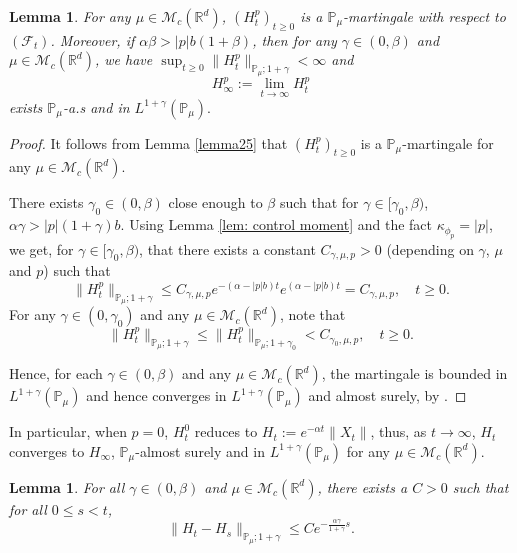 \documentclass[12pt,a4paper]{amsart}
\theoremstyle{plain}
\newtheorem{lem}[thm]{Lemma}
\theoremstyle{definition}
\numberwithin{equation}{section}
\begin{document}
\begin{lem}\label{lemma26}
    For any $\mu\in \mathcal M_c(\mathbb R^d)$, $(H^p_t)_{t\geq 0}$ is a $\mathbb P_\mu$-martingale with respect to $(\mathscr F_t)$.
    Moreover, if $\alpha\beta>|p|b(1+\beta)$, then for any $\gamma\in (0, \beta)$ and $\mu \in \mathcal M_c(\mathbb R^d)$, we have $\sup_{t\geq 0}\|H_t^p\|_{\mathbb P_\mu;1+\gamma}< \infty$ and
\[
    H_{\infty}^p
    :=\lim_{t\rightarrow \infty}H_t^p
\]
exists $\mathbb{P}_{\mu}$-a.s and in $L^{1+\gamma}(\mathbb{P}_{\mu}).$
\end{lem}
\begin{proof}
  It follows from Lemma \ref{lemma25} that $(H_t^p)_{t\geq 0}$ is a $\mathbb P_\mu$-martingale for any $\mu\in \mathcal M_c(\mathbb R^d)$.

    There exists $\gamma_0 \in (0,\beta)$ close enough to $\beta$ such that for $\gamma\in [\gamma_0, \beta)$, $\alpha\gamma>|p|(1+\gamma)b$.
    Using  Lemma \ref{lem: control moment} and the fact $\kappa_{\phi_p}=|p|$,
   we get, for $\gamma\in [\gamma_0, \beta)$, that there exists
    a constant $C_{\gamma, \mu, p}>0$ (depending on $\gamma$, $\mu$ and $p$)  such that
\[
 	\|H_t^p\|_{\mathbb P_\mu;1+\gamma}
    \leq C_{\gamma, \mu, p} e^{-(\alpha-|p|b)t}e^{(\alpha-|p|b)t}
    =C_{\gamma, \mu, p}, \quad t\geq 0.
\]
   For any $\gamma\in (0, \gamma_0)$ and any $\mu\in \mathcal M_c(\mathbb R^d)$, note that
\[
	\|H_t^p\|_{\mathbb P_\mu;1+\gamma}
	\leq\|H_t^p\|_{\mathbb P_\mu;1+\gamma_0}
	<C_{\gamma_0, \mu, p},
	\quad t\geq 0.
\]

   Hence, for each $\gamma \in (0,\beta)$ and any $\mu\in \mathcal M_c(\mathbb R^d)$,
    the martingale is bounded in $L^{1+\gamma}(\mathbb{P}_{\mu})$ and hence converges in $L^{1+\gamma}(\mathbb{P}_{\mu}) $ and almost surely, by \cite[Theorem 5.4.5]{Durrett2010Probability}.
\end{proof}

In particular, when $p=0$, $H_t^0$ reduces to $H_t:=e^{-\alpha t}\|X_t\|$, thus, as $t\rightarrow \infty$, $H_t$ converges to $H_{\infty}$, $\mathbb{P}_{\mu}$-almost surely and in $L^{1+\gamma}(\mathbb{P}_{\mu})$  for any $\mu\in \mathcal M_c(\mathbb R^d)$.

\begin{lem}\label{lem: control of Wt}
 For all $\gamma\in (0,\beta)$ and $\mu\in \mathcal M_c(\mathbb R^d)$, there exists a $C> 0$ such that for all $0\leq s<t$,
\[
    \|H_t-H_s\|_{\mathbb{P}_{\mu};1+\gamma}
    \leq C e^{-\frac{\alpha \gamma}{1+\gamma}s}.
\]
\end{lem}
\end{document}
